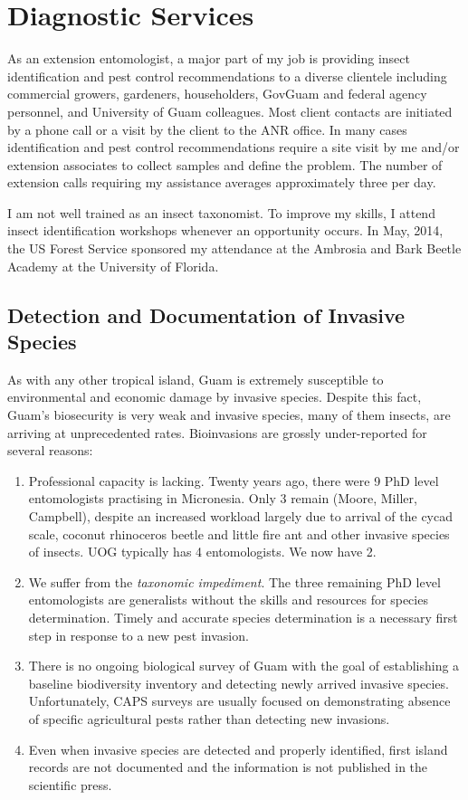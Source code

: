 \documentclass[12pt,oneside,english]{scrbook}
\begin{document}
\section{Diagnostic Services}

As an extension entomologist, a major part of my job is providing
insect identification and pest control recommendations to a diverse
clientele including commercial growers, gardeners, householders, GovGuam
and federal agency personnel, and University of Guam colleagues. Most client contacts are initiated by
a phone call or a visit by the client to the ANR office. In many cases
identification and pest control recommendations require a site visit
by me and/or extension associates to collect samples and define the
problem. The number of extension calls requiring my assistance averages
approximately three per day.

I am not well trained as an insect taxonomist. To improve my skills, I attend 
insect identification workshops whenever an opportunity occurs. In May, 2014,
the US Forest Service sponsored my attendance at the Ambrosia and Bark Beetle
Academy at the University of Florida.

\subsection{Detection and Documentation of Invasive Species}

As with any other tropical island, Guam is extremely susceptible to environmental and economic damage by invasive species. Despite this fact, Guam's biosecurity is very weak and invasive species, many of them insects, are arriving at unprecedented rates. Bioinvasions are grossly under-reported for several reasons:
\begin{enumerate}
\item Professional capacity is lacking. Twenty years ago, there were 9 PhD level entomologists practising in Micronesia. Only 3 remain (Moore, Miller, Campbell), despite an increased workload largely due to arrival of the cycad scale, coconut rhinoceros beetle and little fire ant and other invasive species of insects. UOG typically has 4 entomologists. We now have 2.
\item We suffer from the \emph{taxonomic impediment}. The three remaining PhD level entomologists are generalists without the skills and resources for species determination. Timely and accurate species determination is a necessary first step in response to a new pest invasion.
\item There is no ongoing biological survey of Guam with the goal of establishing a baseline biodiversity inventory and detecting newly arrived invasive species. Unfortunately, CAPS surveys are usually focused on demonstrating absence of specific agricultural pests rather than detecting new invasions.
\item Even when invasive species are detected and properly identified, first island records are not documented and the information is not published in the scientific press. 
\end{enumerate}
\end{document}
